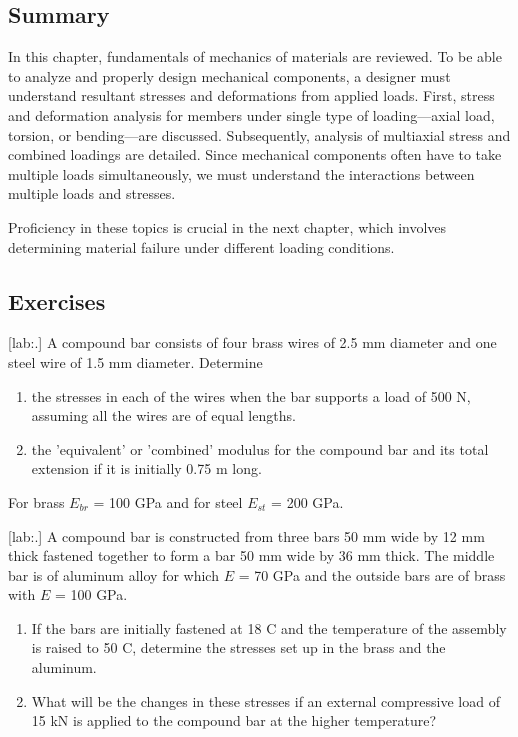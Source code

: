 \documentclass[a4paper,openany,nobib]{tufte-book}
\begin{document}
\subsection{Summary}
\label{summary-2}
In this chapter, fundamentals of mechanics of materials are reviewed. To
be able to analyze and properly design mechanical components, a designer
must understand resultant stresses and deformations from applied loads.
First, stress and deformation analysis for members under single type of
loading---axial load, torsion, or bending---are discussed. Subsequently,
analysis of multiaxial stress and combined loadings are detailed. Since
mechanical components often have to take multiple loads simultaneously,
we must understand the interactions between multiple loads and stresses.

Proficiency in these topics is crucial in the next chapter, which
involves determining material failure under different loading
conditions.

\subsection{Exercises}
\label{exercises-2}
[lab:.] A compound bar consists of
four brass wires of 2.5 mm diameter and one steel wire of 1.5 mm
diameter. Determine



\begin{enumerate}
\item the stresses in each of the wires when the bar supports a load of 500
N, assuming all the wires are of equal lengths.

\item the 'equivalent' or 'combined' modulus for the compound bar and its
total extension if it is initially 0.75 m long.
\end{enumerate}

For brass \(E_{br}\) = 100 GPa and for steel \(E_{st}\) = 200 GPa.

[lab:.] A compound bar is constructed
from three bars 50 mm wide by 12 mm thick fastened together to form a
bar 50 mm wide by 36 mm thick. The middle bar is of aluminum alloy for
which \(E\) = 70 GPa and the outside bars are of brass with \(E\) = 100 GPa.



\begin{enumerate}
\item If the bars are initially fastened at 18 C and the temperature of the
assembly is raised to 50 C, determine the stresses set up in the
brass and the aluminum.

\item What will be the changes in these stresses if an external compressive
load of 15 kN is applied to the compound bar at the higher
temperature?
\end{enumerate}
\end{document}
